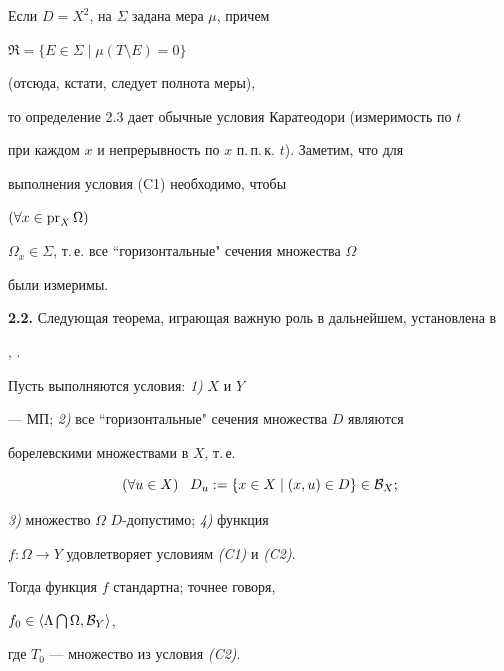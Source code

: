 Если $D=X^2$, на $\Sigma$ задана мера $\mu$, причем


$\Re=\{E\in\Sigma\mid \mu(T\setminus E)=0\}$


(отсюда, кстати, следует полнота меры),


то определение 2.3 дает обычные условия Каратеодори (измеримость по $t$


при каждом $x$ и непрерывность по $x$ п.\,п.\,к. $t$). Заметим, что для


выполнения условия (C1) необходимо, чтобы


$(\forall x\in\operatorname{pr}_X\Omega)$ \;


$\Omega_x\in\Sigma$, т.\,е. все ``горизонтальные" сечения множества $\Omega$


были измеримы.





{\bf 2.2.} Следующая теорема, играющая важную роль в дальнейшем, установлена в


\cite{Sh1}, \cite{Sh2}.





\begin{thms} Пусть выполняются условия: {\em 1)} $X$ и $Y$


--- МП; {\em 2)} все ``горизонтальные" сечения множества $D$ являются


борелевскими множествами в $X$, т.\,е.


%


\begin{equation}


(\forall u\in X) \;\;\; D_u :=\{x\in X\mid (x,u)\in D\}\in{\cal B}_X;


\end{equation}


%


{\em 3)} множество $\Omega$ \; $D$-допустимо; {\em 4)} функция


$f:\Omega\to Y$ удовлетворяет условиям {\em (C1)} и {\em (C2)}.





Тогда функция $f$ стандартна; точнее говоря,


$f_0\in\langle \Lambda\bigcap\Omega,{\cal B}_Y\rangle $,


где $T_0$ --- множество из условия {\em (C2)}.


\end{thms}





